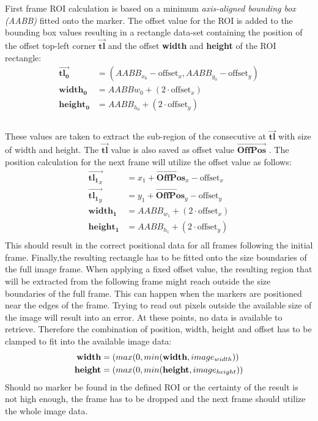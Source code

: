 First frame ROI calculation is based on a minimum \textit{axis-aligned bounding box (AABB)} fitted onto the marker. The offset value for the ROI is added to the bounding box values resulting in a rectangle data-set containing the position of the offset top-left corner $\vec{\mathbf{tl}}$ and the offset 
\textbf{width} and \textbf{height} of the ROI rectangle:\\
\begin{equation}
\begin{split}
\vec{\mathbf{tl_{0}}}&=(AABB_{x_{0}}-\text{offset}_{x},AABB_{y_{0}}-\text{offset}_{y})\\
\mathbf{width_{0}}&=AABB{w_{0}}+(2\cdot\text{offset}_{x})\\
\mathbf{height_{0}}&=AABB_{h_{0}}+(2\cdot\text{offset}_{y})\\
\end{split}
\end{equation}\\
These values are taken to extract the sub-region of the consecutive at $\vec{\mathbf{tl}}$ with size of width and height. The $\vec{\mathbf{tl}}$ value is also saved as offset value $\vec{\mathbf{OffPos}}$ .
The position calculation for the next frame will utilize the offset value as follows:
\begin{equation}
\begin{split}
\vec{\mathbf{tl_{1}}_{x}}&=x_{1}+\vec{\mathbf{OffPos}}_{x}-\text{offset}_{x} \\ \vec{\mathbf{tl_{1}}_{y}}&=y_{1}+\vec{\mathbf{OffPos}}_{y}-\text{offset}_{y}\\
\mathbf{width_{1}}&=AABB_{w_{1}}+(2\cdot\text{offset}_{x})\\
\mathbf{height_{1}}&=AABB_{h_{1}}+(2\cdot\text{offset}_{y})\\
\end{split}
\end{equation}
This should result in the correct positional data for all frames following the initial frame.
Finally,the resulting rectangle has to be fitted onto the size boundaries of the full image frame. When applying a fixed offset value, the resulting region that will be extracted from the following frame might reach outside the size boundaries of the full frame. This can happen when the markers are positioned near the edges of the frame. Trying to read out pixels outside the available size of the image will result into an error. At these points, no data is available to retrieve. Therefore the combination of position, width, height and offset has to be clamped to fit into the available image data:
\begin{equation}
\begin{split}
\textbf{width}&=\text(max(0,min(\mathbf{width},image_{width}))\\
\textbf{height}&=\text(max(0,min(\mathbf{height},image_{height}))
\end{split}
\end{equation}
Should no marker be found in the defined ROI or the certainty of the result is not high enough, the frame has to be dropped and the next frame should utilize the whole image data.\newpage
